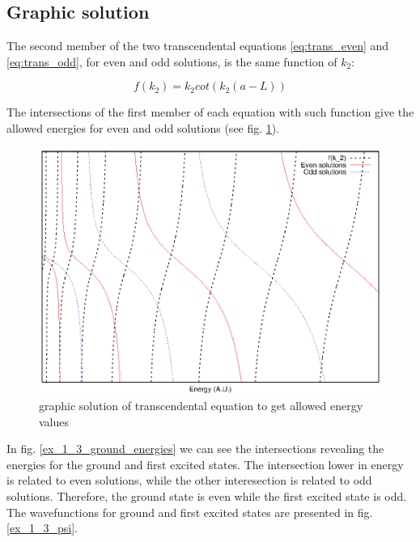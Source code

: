 \documentclass{article}
\begin{document}
\subsection{Graphic solution}
The second member of the two transcendental equations \eqref{eq:trans_even} and \eqref{eq:trans_odd}, for even and odd solutions, is the same function of \(k_{2}\):

\begin{equation}
f(k_{2}) = k_{2} cot(k_{2}(a-L))
\end{equation}

The intersections of the first member of each equation with such function give the allowed energies for even and odd solutions (see fig. \ref{graph_sol_ex_1_3}).

\begin{figure}
\centering
\includegraphics{graph_sol_ex_1_3.eps}
\caption{graphic solution of transcendental equation to get allowed energy values}
\label{graph_sol_ex_1_3}
\end{figure}

In fig. \ref{ex_1_3_ground_energies} we can see the intersections revealing the energies for the ground and first excited states. The intersection lower in energy is related to even solutions, while the other interesection is related to odd solutions. Therefore, the ground state is even while the first excited state is odd. The wavefunctions for ground and first excited states are presented in fig. \ref{ex_1_3_psi}.
\end{document}
